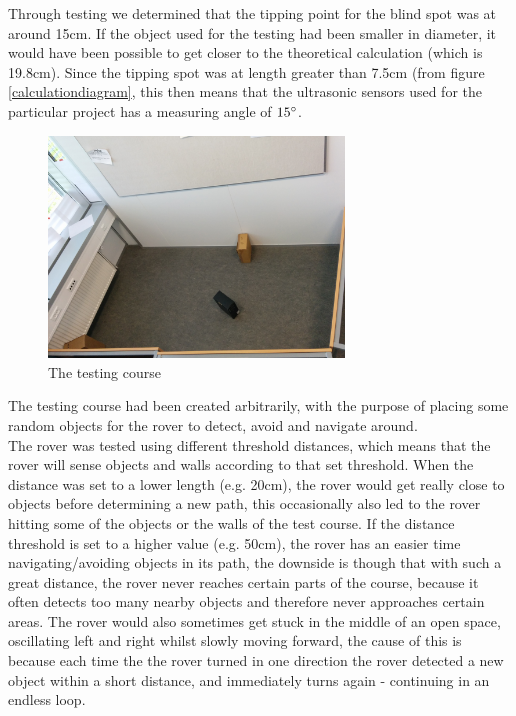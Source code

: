 Through testing we determined that the tipping point for the blind spot was at around 15cm. If the object used for the testing had been smaller in diameter, it would have been possible to get closer to the theoretical calculation (which is 19.8cm). Since the tipping spot was at length greater than 7.5cm (from figure \ref{calculationdiagram}, this then means that the ultrasonic sensors used for the particular project has a measuring angle of $15\degree$. \\

\begin{figure}[H]
	\centering
	\includegraphics[width=0.7\textwidth]{images/testing-course.jpg}
	\caption{The testing course}
	\label{testcourse}
\end{figure}

The testing course had been created arbitrarily, with the purpose of placing some random objects for the rover to detect, avoid and navigate around.\\
The rover was tested using different threshold distances, which means that the rover will sense objects and walls according to that set threshold. When the distance was set to a lower length (e.g. 20cm), the rover would get really close to objects before determining a new path, this occasionally also led to the rover hitting some of the objects or the walls of the test course. If the distance threshold is set to a higher value (e.g. 50cm), the rover has an easier time navigating/avoiding objects in its path, the downside is though that with such a great distance, the rover never reaches certain parts of the course, because it often detects too many nearby objects and therefore never approaches certain areas. The rover would also sometimes get stuck in the middle of an open space, oscillating  left and right whilst slowly moving forward, the cause of this is because each time the the rover turned in one direction the rover detected a new object within a short distance, and immediately turns again - continuing in an endless loop.

